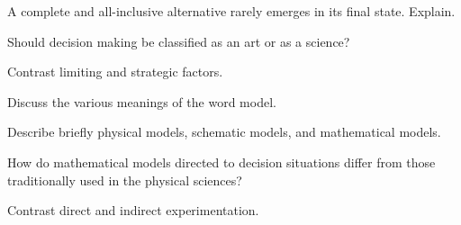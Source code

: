 \begin{exercises}
    \begin{exercise}
    \label{sea-7-1}
        A complete and all-inclusive alternative rarely emerges in its final state. Explain.
    \end{exercise}
    \begin{solution}
    \end{solution}
    
    \begin{exercise}
    \label{sea-7-2}
        Should decision making be classified as an art or as a science?
    \end{exercise}
    \begin{solution}
    \end{solution}
    
    \begin{exercise}
    \label{sea-7-3}
        Contrast limiting and strategic factors.
    \end{exercise}
    \begin{solution}
    \end{solution}
    
    \begin{exercise}
    \label{sea-7-4}
        Discuss the various meanings of the word model.
    \end{exercise}
    \begin{solution}
    \end{solution}
    
    \begin{exercise}
    \label{sea-7-5}
        Describe briefly physical models, schematic models, and mathematical models.
    \end{exercise}
    \begin{solution}
    \end{solution}
    
    \begin{exercise}
    \label{sea-7-6}
        How do mathematical models directed to decision situations differ from those traditionally used in the physical sciences?
    \end{exercise}
    \begin{solution}
    \end{solution}
    
    \begin{exercise}
    \label{sea-7-7}
        Contrast direct and indirect experimentation.
    \end{exercise}
    \begin{solution}
    \end{solution}
    

\end{exercises}
